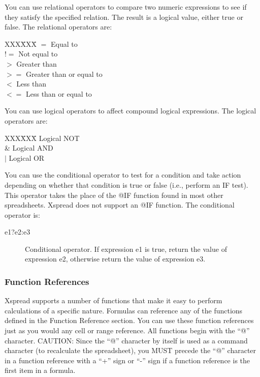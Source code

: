     You can use relational operators to compare two numeric expressions to see 
if they satisfy the specified relation.  The result is a logical value, either 
true or false.  The relational operators are:
\begin{tabbing}
XXX\=XXX\=\kill
\>    $=$   \> Equal to\\
\>   $!=$  \> Not equal to\\
\>     $>$   \> Greater than\\
\>    $>=$  \> Greater than or equal to\\
\>    $<$   \> Less than\\
\>    $<=$  \> Less than or equal to
\end{tabbing}

    You can use logical operators to affect compound logical expressions.  The 
logical operators are:
\begin{tabbing}
XXX\=XXX\=\kill
 \>   \twiddle \>  Logical NOT\\
 \>   \& \>  Logical AND\\
 \>   $|$  \> Logical OR\\
\end{tabbing}

    You can use the conditional operator to test for a condition and take 
action depending on whether that condition is true or false (i.e., perform an 
IF test).  This operator takes the place of the @IF function found in most 
other spreadsheets.  Xspread does not support an @IF function.  The 
conditional operator is:
\begin{description}
\item[e1?e2:e3]{Conditional operator.  If expression e1 is true, return the
value of expression e2, otherwise return the value of 
expression e3.}
\end{description}

\subsubsection*{Function References}

    Xspread supports a number of functions that make it easy to perform 
calculations of a specific nature.  Formulas can reference any of the 
functions defined in the Function Reference section.  You can use these 
function references just as you would any cell or range reference.  All 
functions begin with the ``@'' character.  CAUTION:  Since the ``@'' character by
itself is used as a command character (to recalculate the spreadsheet), you 
MUST precede the ``@'' character in a function reference with a ``+'' sign or ``-''
sign if a function reference is the first item in a formula.


